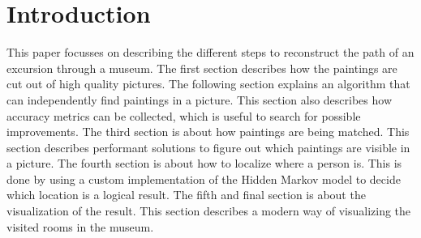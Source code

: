 \section*{Introduction}

This paper focusses on describing the different steps to reconstruct the path of an excursion through a museum. The first section describes how the paintings are cut out of high quality pictures. The following section explains an algorithm that can independently find paintings in a picture. This section also describes how accuracy metrics can be collected, which is useful to search for possible improvements. The third section is about how paintings are being matched. This section describes performant solutions to figure out which paintings are visible in a picture. The fourth section is about how to localize where a person is. This is done by using a custom implementation of the Hidden Markov model to decide which location is a logical result. The fifth and final section is about the visualization of the result. This section describes a modern way of visualizing the visited rooms in the museum.
